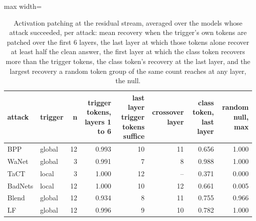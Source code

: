 \begin{table}[htbp]
\centering
\small
\caption{Activation patching at the residual stream, averaged over the models whose attack succeeded, per attack: mean recovery when the trigger's own tokens are patched over the first 6 layers, the last layer at which those tokens alone recover at least half the clean answer, the first layer at which the class token recovers more than the trigger tokens, the class token's recovery at the last layer, and the largest recovery a random token group of the same count reaches at any layer, the null.}
\label{tab:activation-patching}
\begin{adjustbox}{max width=\linewidth}
\begin{tabular}{llrrrrrr}
\toprule
attack & trigger & n & trigger tokens, layers 1 to 6 & last layer trigger tokens suffice & crossover layer & class token, last layer & random null, max \\
\midrule
BPP & global & 12 & 0.993 & 10 & 11 & 0.656 & 1.000 \\
WaNet & global & 3 & 0.991 & 7 & 8 & 0.988 & 1.000 \\
TaCT & local & 3 & 1.000 & 12 & -- & 0.371 & 0.000 \\
BadNets & local & 12 & 1.000 & 10 & 12 & 0.661 & 0.005 \\
Blend & global & 12 & 0.934 & 8 & 11 & 0.755 & 0.966 \\
LF & global & 12 & 0.996 & 9 & 10 & 0.782 & 1.000 \\
\bottomrule
\end{tabular}
\end{adjustbox}
\end{table}
